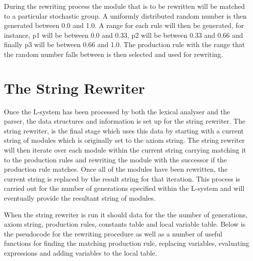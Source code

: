 During the rewriting process the module that is to be rewritten will be matched to a particular stochastic group. A uniformly distributed random number is then generated between 0.0 and 1.0. A range for each rule will then be generated, for instance, p1 will be between 0.0 and 0.33, p2 will be between 0.33 and 0.66 and finally p3 will be between 0.66 and 1.0. The production rule with the range that the random number falls between is then selected and used for rewriting. 

\section{The String Rewriter}

Once the L-system has been processed by both the lexical analyser and the parser, the data structures and information is set up for the string rewriter. The string rewriter, is the final stage which uses this data by starting with a current string of modules which is originally set to the axiom string. The string rewriter will then iterate over each module within the current string carrying matching it to the production rules and rewriting the module with the successor if the production rule matches. Once all of the modules have been rewritten, the current string is replaced by the result string for that iteration. This process is carried out for the number of generations specified within the L-system and will eventually provide the resultant string of modules.

When the string rewriter is run it should data for the the number of generations, axiom string, production rules, constants table and local variable table. Below is the pseudocode for the rewriting procedure as well as a number of useful functions for finding the matching production rule, replacing variables, evaluating expressions and adding variables to the local table. 

